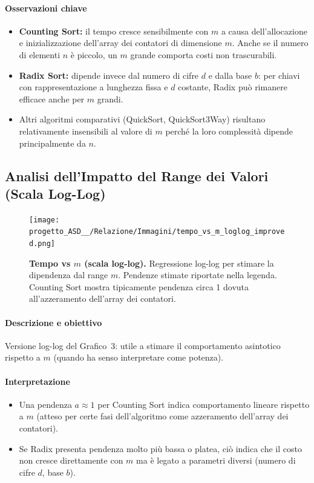 \documentclass[a4paper, 11pt]{article}
\begin{document}
\paragraph{Osservazioni chiave}
\begin{itemize}
  \item \textbf{Counting Sort:} il tempo cresce sensibilmente con \(m\) a causa dell'allocazione e inizializzazione dell'array dei contatori di dimensione \(m\). Anche se il numero di elementi \(n\) è piccolo, un \(m\) grande comporta costi non trascurabili.
  \item \textbf{Radix Sort:} dipende invece dal numero di cifre \(d\) e dalla base \(b\): per chiavi con rappresentazione a lunghezza fissa e \(d\) costante, Radix può rimanere efficace anche per \(m\) grandi.
  \item Altri algoritmi comparativi (QuickSort, QuickSort3Way) risultano relativamente insensibili al valore di \(m\) perché la loro complessità dipende principalmente da \(n\).
\end{itemize}

\subsection{Analisi dell'Impatto del Range dei Valori (Scala Log-Log)}
\begin{figure}[H]
\centering
\texttt{[image: progetto\_ASD\_\_/Relazione/Immagini/tempo\_vs\_m\_loglog\_improved.png]}
\caption{\textbf{Tempo vs \(m\) (scala log-log).} Regressione log-log per stimare la dipendenza dal range \(m\). Pendenze stimate riportate nella legenda. Counting Sort mostra tipicamente pendenza circa 1 dovuta all'azzeramento dell'array dei contatori.}
\label{fig:variazione_m}
\end{figure}

\paragraph{Descrizione e obiettivo}
Versione log-log del Grafico~3: utile a stimare il comportamento asintotico rispetto a \(m\) (quando ha senso interpretare come potenza).

\paragraph{Interpretazione}
\begin{itemize}
  \item Una pendenza \(a\approx 1\) per Counting Sort indica comportamento lineare rispetto a \(m\) (atteso per certe fasi dell'algoritmo come azzeramento dell'array dei contatori).
  \item Se Radix presenta pendenza molto più bassa o platea, ciò indica che il costo non cresce direttamente con \(m\) ma è legato a parametri diversi (numero di cifre \(d\), base \(b\)).
\end{itemize}
\end{document}
